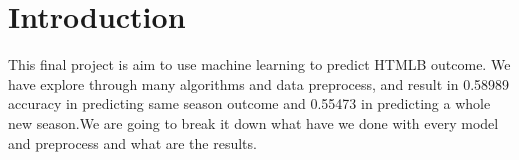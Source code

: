 \section{Introduction}
\par This final project is aim to use machine learning to predict HTMLB outcome. We have explore through many algorithms and data preprocess, and result in 0.58989 accuracy in predicting same season outcome and 0.55473 in predicting a whole new season.We are going to break it down what have we done with every model and preprocess and what are the results.
